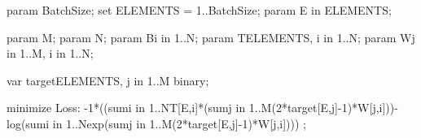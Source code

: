 param BatchSize;
set ELEMENTS = 1..BatchSize;
param E in ELEMENTS;

param M;
param N;
param B{i in 1..N};
param T{ELEMENTS, i in 1..N};
param W{j in 1..M, i in 1..N};

var target{ELEMENTS, j in 1..M} binary;

minimize Loss:
	-1*((sum{i in 1..N}T[E,i]*(sum{j in 1..M}(2*target[E,j]-1)*W[j,i]))-log(sum{i in 1..N}exp(sum{j in 1..M}(2*target[E,j]-1)*W[j,i]))) ;

